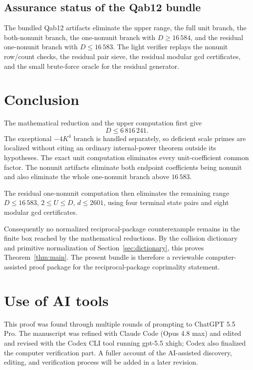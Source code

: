 \documentclass[11pt]{article}
\numberwithin{equation}{section}
\theoremstyle{definition}
\begin{document}
\subsection*{Assurance status of the Qab12 bundle}

The bundled Qab12 artifacts eliminate the upper range, the full
unit branch, the both-nonunit branch, the one-nonunit branch with
\(D\geq16\,584\), and the residual one-nonunit branch with
\(D\leq16\,583\).  The light verifier replays the nonunit row/count checks,
the residual pair sieve, the residual modular gcd certificates, and the small
brute-force oracle for the residual generator.

\section*{Conclusion}

The mathematical reduction and the upper computation first give
\[
 D\leq6\,816\,241.
\]
The exceptional \(-4K^4\) branch is handled separately, so deficient scale
primes are localized without citing an ordinary internal-power theorem outside
its hypotheses.  The exact unit computation eliminates every unit-coefficient
common factor.  The nonunit artifacts eliminate both endpoint coefficients
being nonunit and also eliminate the whole one-nonunit branch above
\(16\,583\).

The residual one-nonunit computation then eliminates the remaining
range \(D\leq16\,583\), \(2\leq U\leq D\), \(d\leq2601\), using four terminal
state pairs and eight modular gcd certificates.

Consequently no normalized reciprocal-package counterexample remains in the
finite box reached by the mathematical reductions.  By the collision
dictionary and primitive normalization of Section~\ref{sec:dictionary}, this
proves Theorem~\ref{thm:main}.  The present bundle is therefore a reviewable
computer-assisted proof package for the reciprocal-package coprimality
statement.

\section*{Use of AI tools}

This proof was found through multiple rounds of prompting to ChatGPT 5.5 Pro.
The manuscript was refined with Claude Code (Opus 4.8 max) and edited and
revised with the Codex CLI tool running gpt-5.5 xhigh; Codex also finalized
the computer verification part.  A fuller account of the AI-assisted
discovery, editing, and verification process will be added in a later
revision.
\end{document}
